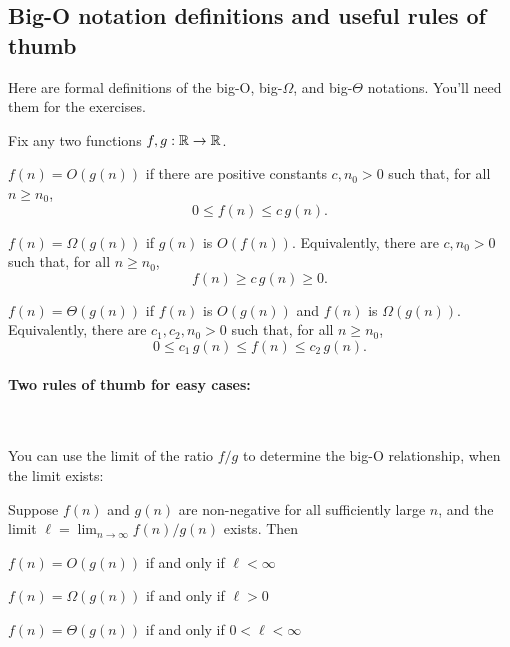 \documentclass[11pt]{article}
\begin{document}
\subsection{Big-O notation definitions and useful rules of thumb}\label{prelim: sec: big-O}

Here are formal definitions of the big-O, big-$\Omega$, and big-$\Theta$ notations.
You'll need them for the exercises.

\begin{definition} Fix any two functions $f, g:\mathbb{R}\rightarrow \mathbb{R}$. 
  \begin{mylist}[$\bullet$]
  \item $f(n) = O(g(n))$ if there are positive constants $c, n_0 > 0$ such that,
  for all $n \ge n_0$,
  \[ 0 \le f(n) \le c\, g(n). \]

\item  $f(n) = \Omega(g(n))$ if $g(n)$ is $O(f(n))$.  Equivalently,
  there are $c, n_0>0$ such that, for all $n \ge n_0$,
  \[ f(n) \ge c\, g(n) \ge 0. \]

\item  $f(n) = \Theta(g(n))$ if $f(n)$ is $O(g(n))$ and $f(n)$ is $\Omega(g(n))$.
  Equivalently, there are $c_1, c_2, n_0>0$ such that, for all $n \ge n_0$,
  \[ 0 \le c_1\, g(n) \le f(n) \le c_2\, g(n). \]
\end{mylist}
\end{definition}

\paragraph{Two rules of thumb for easy cases:}~

You can use the limit of the ratio $f/g$ to determine the big-O relationship, when the limit exists:

\begin{lemma}\label{prelim: lemma: ratio}
  Suppose $f(n)$ and $g(n)$ are non-negative for all sufficiently large $n$,
  and the limit $\ell = \lim_{n\rightarrow\infty} f(n)/g(n)$ exists.
  Then
  \begin{mylist}[$\bullet$]
  \item $f(n) = O(g(n))$ if and only if $\ell < \infty$
  \item $f(n) = \Omega(g(n))$ if and only if $\ell > 0$
  \item $f(n) = \Theta(g(n))$ if and only if $0 < \ell < \infty$
  \end{mylist}
\end{lemma}
\end{document}
